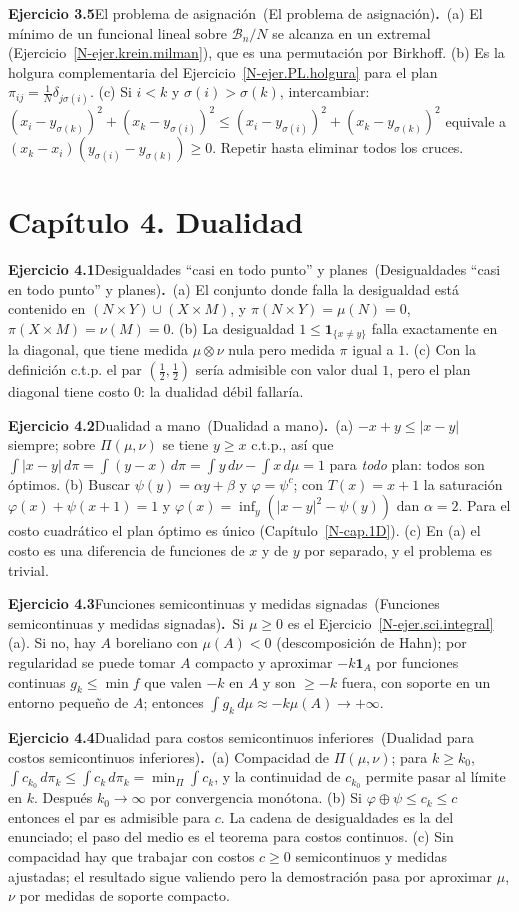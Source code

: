 \documentclass[11pt,a4paper]{amsart}
\newcommand{\B}{{\mathcal B}}
\newcommand{\I}{{\mathbf 1}}
\theoremstyle{remark}
\theoremstyle{definition}
\numberwithin{subsection}{section}
\numberwithin{equation}{section}
\newcommand{\ejlabel}[2]{\par\medskip\noindent\textbf{Ejercicio #1}\ifx\relax#2\relax\else\ (#2)\fi\textbf{.}\ }
\begin{document}
\ejlabel{3.5}{El problema de asignación}(a) El mínimo de un funcional lineal sobre $\B_n/N$ se alcanza en un extremal (Ejercicio~\ref{N-ejer.krein.milman}), que es una permutación por Birkhoff. (b) Es la holgura complementaria del Ejercicio~\ref{N-ejer.PL.holgura} para el plan $\pi_{ij}=\frac1N\delta_{j\sigma(i)}$. (c) Si $i<k$ y $\sigma(i)>\sigma(k)$, intercambiar: $(x_i-y_{\sigma(k)})^2+(x_k-y_{\sigma(i)})^2\le(x_i-y_{\sigma(i)})^2+(x_k-y_{\sigma(k)})^2$ equivale a $(x_k-x_i)(y_{\sigma(i)}-y_{\sigma(k)})\ge0$. Repetir hasta eliminar todos los cruces.

\section*{Capítulo 4. Dualidad}
\ejlabel{4.1}{Desigualdades ``casi en todo punto'' y planes}(a) El conjunto donde falla la desigualdad está contenido en $(N\times Y)\cup(X\times M)$, y $\pi(N\times Y)=\mu(N)=0$, $\pi(X\times M)=\nu(M)=0$. (b) La desigualdad $1\le\I_{\{x\ne y\}}$ falla exactamente en la diagonal, que tiene medida $\mu\otimes\nu$ nula pero medida $\pi$ igual a $1$. (c) Con la definición c.t.p. el par $(\frac12,\frac12)$ sería admisible con valor dual $1$, pero el plan diagonal tiene costo $0$: la dualidad débil fallaría.

\ejlabel{4.2}{Dualidad a mano}(a) $-x+y\le|x-y|$ siempre; sobre $\Pi(\mu,\nu)$ se tiene $y\ge x$ c.t.p., así que $\int|x-y|\,d\pi=\int(y-x)\,d\pi=\int y\,d\nu-\int x\,d\mu=1$ para \emph{todo} plan: todos son óptimos. (b) Buscar $\psi(y)=\alpha y+\beta$ y $\varphi=\psi^c$; con $T(x)=x+1$ la saturación $\varphi(x)+\psi(x+1)=1$ y $\varphi(x)=\inf_y(|x-y|^2-\psi(y))$ dan $\alpha=2$. Para el costo cuadrático el plan óptimo es único (Capítulo~\ref{N-cap.1D}). (c) En (a) el costo es una diferencia de funciones de $x$ y de $y$ por separado, y el problema es trivial.

\ejlabel{4.3}{Funciones semicontinuas y medidas signadas}Si $\mu\ge0$ es el Ejercicio~\ref{N-ejer.sci.integral}(a). Si no, hay $A$ boreliano con $\mu(A)<0$ (descomposición de Hahn); por regularidad se puede tomar $A$ compacto y aproximar $-k\I_A$ por funciones continuas $g_k\le\min f$ que valen $-k$ en $A$ y son $\ge-k$ fuera, con soporte en un entorno pequeño de $A$; entonces $\int g_k\,d\mu\approx-k\mu(A)\to+\infty$.

\ejlabel{4.4}{Dualidad para costos semicontinuos inferiores}(a) Compacidad de $\Pi(\mu,\nu)$; para $k\ge k_0$, $\int c_{k_0}\,d\pi_k\le\int c_k\,d\pi_k=\min_\Pi\int c_k$, y la continuidad de $c_{k_0}$ permite pasar al límite en $k$. Después $k_0\to\infty$ por convergencia monótona. (b) Si $\varphi\oplus\psi\le c_k\le c$ entonces el par es admisible para $c$. La cadena de desigualdades es la del enunciado; el paso del medio es el teorema para costos continuos. (c) Sin compacidad hay que trabajar con costos $c\ge0$ semicontinuos y medidas ajustadas; el resultado sigue valiendo pero la demostración pasa por aproximar $\mu$, $\nu$ por medidas de soporte compacto.
\end{document}

